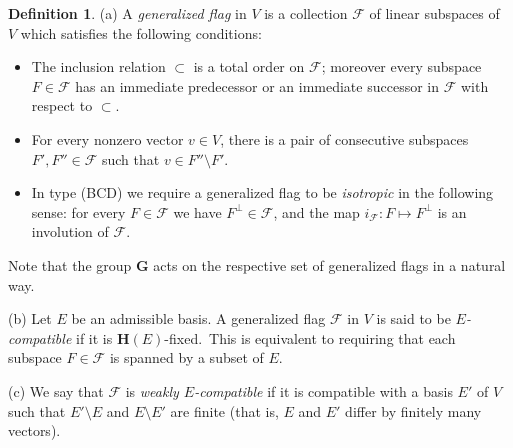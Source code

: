 \documentclass[12pt]{amsart}
\newcommand{\G}{\mathbf{G}}
\renewcommand{\H}{\mathbf{H}}
\newcommand{\Ff}{\mathcal{F}}
\newcommand{\os}{\Sigma}
\numberwithin{equation}{section}
\theoremstyle{definition}
\newtheorem{definition}[theorem]{Definition}
\begin{document}
\begin{definition}
\label{D4}
{\rm (a)} A {\em generalized flag} in $V$ is a collection $\mathcal{F}$ of linear subspaces of $V$ which satisfies the following conditions:
\begin{itemize}
\item The inclusion relation $\subset$ is a total order on $\Ff$;
moreover every subspace $F\in\Ff$ has an immediate predecessor or an immediate successor in $\mathcal{F}$ with respect to $\subset$.
\item For every nonzero vector $v\in V$, there is a pair of consecutive subspaces $F',F''\in\mathcal{F}$ such that $v\in F''\setminus F'$.
\item In type (BCD) we require a generalized flag to be {\em isotropic} in the following sense: for every $F\in\Ff$ we have $F^\perp\in\Ff$, and the map $i_\Ff:F\mapsto F^\perp$ is an involution of $\Ff$.
\end{itemize}
Note that the group $\G$ acts on the respective set of generalized flags in a natural way.




{\rm (b)} Let $E$ be an admissible basis. A generalized flag $\mathcal{F}$ in $V$ is said to be {\em $E$-compatible} if it is $\H(E)$-fixed.\ This is equivalent to requiring that each subspace $F\in\Ff$ is spanned by a subset of $E$.

{\rm (c)}
We say that $\Ff$ is {\em weakly $E$-compatible} if it is compatible with a basis $E'$ of $V$ such that $E'\setminus E$ and $E\setminus E'$ are finite (that is, $E$ and $E'$ differ by finitely many vectors).
\end{definition}
\end{document}
